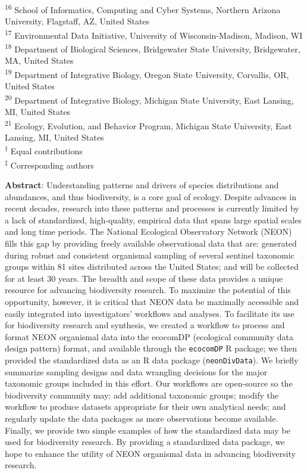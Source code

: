 \documentclass[
  12pt,
]{article}
\begin{document}
\textsuperscript{16} School of Informatics, Computing and Cyber Systems, Northern Arizona University, Flagstaff, AZ, United States\\
\textsuperscript{17} Environmental Data Initiative, University of Wisconsin-Madison, Madison, WI
\textsuperscript{18} Department of Biological Sciences, Bridgewater State University, Bridgewater, MA, United States\\
\textsuperscript{19} Department of Integrative Biology, Oregon State University, Corvallis, OR, United States\\
\textsuperscript{20} Department of Integrative Biology, Michigan State University, East Lansing, MI, United States\\
\textsuperscript{21} Ecology, Evolution, and Behavior Program, Michigan State University, East Lansing, MI, United States\\
\textsuperscript{†} Equal contributions\\
\textsuperscript{‡} Corresponding authors

\normalsize

\textbf{Abstract}: Understanding patterns and drivers of species distributions and abundances, and thus biodiversity, is a core goal of ecology. Despite advances in recent decades, research into these patterns and processes is currently limited by a lack of standardized, high-quality, empirical data that spans large spatial scales and long time periods. The National Ecological Observatory Network (NEON) fills this gap by providing freely available observational data that are: generated during robust and consistent organismal sampling of several sentinel taxonomic groups within 81 sites distributed across the United States; and will be collected for at least 30 years. The breadth and scope of these data provides a unique resource for advancing biodiversity research. To maximize the potential of this opportunity, however, it is critical that NEON data be maximally accessible and easily integrated into investigators' workflows and analyses. To facilitate its use for biodiversity research and synthesis, we created a workflow to process and format NEON organismal data into the ecocomDP (ecological community data design pattern) format, and available through the \texttt{ecocomDP} R package; we then provided the standardized data as an R data package (\texttt{neonDivData}). We briefly summarize sampling designs and data wrangling decisions for the major taxonomic groups included in this effort. Our workflows are open-source so the biodiversity community may: add additional taxonomic groups; modify the workflow to produce datasets appropriate for their own analytical needs; and regularly update the data packages as more observations become available. Finally, we provide two simple examples of how the standardized data may be used for biodiversity research. By providing a standardized data package, we hope to enhance the utility of NEON organismal data in advancing biodiversity research.
\end{document}
